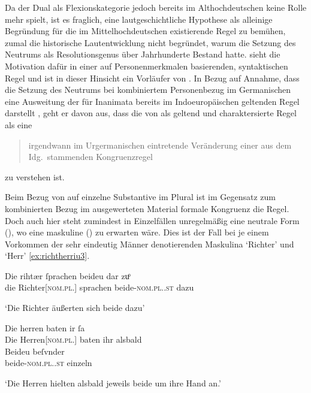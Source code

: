 Da der Dual als Flexionskategorie jedoch bereits im Althochdeutschen keine
Rolle mehr spielt, ist es fraglich, eine lautgeschichtliche Hypothese als
alleinige Begründung für die im Mittel\-hoch\-deutschen existierende Regel zu
bemühen, zumal die historische Lautentwicklung nicht begründet, warum die
Setzung des Neutrums als Resolutionsgenus über Jahrhunderte Bestand hatte.
\citet{askedal1973} sieht die Motivation dafür in einer auf Personenmerkmalen
basierenden, syntaktischen Regel und ist in dieser Hinsicht ein Vorläufer von
\citet{corbett1983,wechslerzlatic2003}. In Bezug auf
 Annahme, dass die Setzung des Neutrums bei
kombiniertem Personenbezug im Germanischen eine Ausweitung der für Inanimata
bereits im Indoeuropäischen geltenden Regel darstellt
\autocite[vgl.~auch][156--157]{hock2008}, geht er davon aus, dass die von
\textcites[28]{behaghel1928}[188]{dal2014} als 
geltend und  charaktersierte Regel als eine
\blockcquote[15]{askedal1973}{irgendwann im Urgermanischen
eintretende\textdel{} Veränderung einer aus dem Idg.\ stammenden
Kongruenzregel} zu verstehen ist.

Beim Bezug von  auf einzelne Substantive im Plural ist im
Gegensatz zum kombinierten Bezug im ausgewerteten Material formale Kongruenz
die Regel. Doch auch hier steht zumindest in Einzelfällen unregelmäßig eine
neutrale Form (), wo eine maskuline () zu erwarten
wäre. Dies ist der Fall bei je einem Vorkommen der sehr eindeutig Männer
denotierenden Maskulina  `Richter' und 
`Herr' \cref{ex:richtherriu3}.

\begin{exe}
\ex \label{ex:richtherriu3}
	\begin{xlist}
	\ex \gll Die rihtær ſprachen beideu {dar zuͦ} \\
			die Richter[\textsc{nom.pl.\MascM}] sprachen beide-\textsc{nom.pl.\NeutM.st}
			dazu \\
		\begin{taggedline}{\parencites[\pno~28\ra, 8]{kc:B1}[vgl.~abweichend][10090]{schroeder1895}} %
		\trans `Die Richter äußerten sich beide dazu'
		\end{taggedline}
		\label{ex:richtherriu3_1}

	\ex \gll Die herren baten ir ſa \\
			Die Herren[\textsc{nom.pl.\MascM}] baten ihr alsbald \\
	\sn \gll Beideu beſvnder \\
			beide-\textsc{nom.pl.\NeutM.st} einzeln \\
		\begin{taggedline}{\parencites[\pno~31\va, 48--49]{kc:B1}[vgl.][11385--11386]{schroeder1895}} %
		\trans `Die Herren hielten alsbald jeweils beide um ihre Hand an.'
		\end{taggedline}
		\label{ex:richtherriu3_2}
	\end{xlist}
\end{exe}

